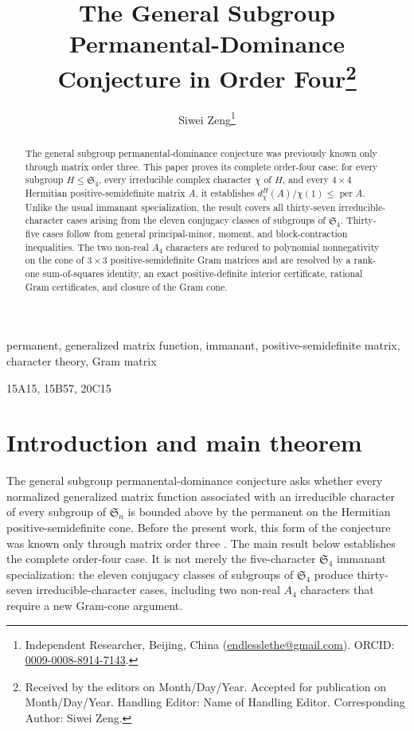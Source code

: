 \documentclass[10pt,twoside]{siamart1116}
\newcommand{\HE}{Name of Handling Editor}
\newcommand{\DoS}{Month/Day/Year}
\newcommand{\DoA}{Month/Day/Year}
\newcommand{\CA}{Siwei Zeng}
\newcommand{\Names}{S. Zeng}
\newcommand{\Title}{The General Subgroup Permanental-Dominance Conjecture in Order Four}
\newcommand{\ShortTitle}{Permanental dominance in order four}
\newcommand{\Sn}{\mathfrak S}
\newcommand{\per}{\operatorname{per}}
\begin{document}

\setcounter{page}{1}
\thispagestyle{empty}

\title{\Title\thanks{Received by the editors on \DoS.
Accepted for publication on \DoA.
Handling Editor: \HE. Corresponding Author: \CA.}}

\author{Siwei Zeng\thanks{Independent Researcher, Beijing, China
(\href{mailto:endlesslethe@gmail.com}{endlesslethe@gmail.com}).
ORCID: \href{https://orcid.org/0009-0008-8914-7143}{0009-0008-8914-7143}.}}

\markboth{\Names}{\ShortTitle}
\maketitle

\begin{abstract}
The general subgroup permanental-dominance conjecture was previously known
only through matrix order three.  This paper proves its complete order-four
case: for every subgroup $H\leq\Sn_4$, every irreducible complex character
$\chi$ of $H$, and every $4\times4$ Hermitian positive-semidefinite matrix
$A$, it establishes $d_\chi^H(A)/\chi(1)\leq\per A$.  Unlike the usual
immanant specialization, the result covers all thirty-seven
irreducible-character cases arising from the eleven conjugacy classes of
subgroups of $\Sn_4$.  Thirty-five cases follow from general principal-minor,
moment, and block-contraction inequalities.  The two non-real $A_4$
characters are reduced to polynomial nonnegativity on the cone of
$3\times3$ positive-semidefinite Gram matrices and are resolved by a
rank-one sum-of-squares identity, an exact positive-definite interior
certificate, rational Gram certificates, and closure of the Gram cone.
\end{abstract}

\begin{keywords}
permanent, generalized matrix function, immanant, positive-semidefinite
matrix, character theory, Gram matrix
\end{keywords}

\begin{AMS}
15A15, 15B57, 20C15
\end{AMS}

\section{Introduction and main theorem}\label{sec:introduction}

The general subgroup permanental-dominance conjecture asks whether every
normalized generalized matrix function associated with an irreducible
character of every subgroup of $\Sn_n$ is bounded above by the permanent on
the Hermitian positive-semidefinite cone.  Before the present work, this
form of the conjecture was known only through matrix order three
\cite{tabata2015,wanless2022}.  The main result below establishes the complete
order-four case.  It is not merely the five-character $\Sn_4$ immanant
specialization: the eleven conjugacy classes of subgroups of $\Sn_4$ produce
thirty-seven irreducible-character cases, including two non-real $A_4$
characters that require a new Gram-cone argument.
\end{document}

